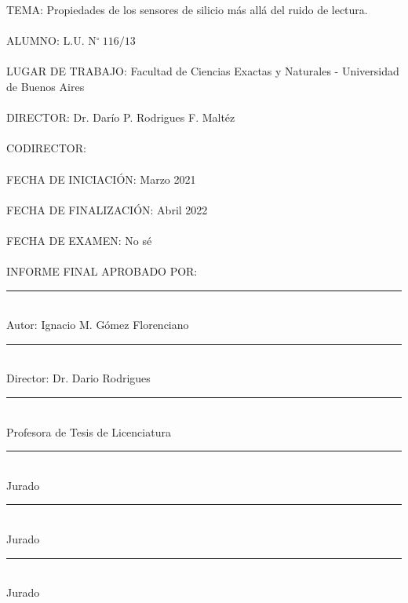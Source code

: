 \thispagestyle{empty}
\noindent TEMA: Propiedades de los sensores de silicio más allá del ruido de lectura.\\
\\
\noindent ALUMNO: L.U. N$^\circ\ 116/13$\\
\\
\noindent LUGAR DE TRABAJO: Facultad de Ciencias Exactas y Naturales - Universidad de Buenos Aires\\
\\
\noindent DIRECTOR: Dr. Darío P. Rodrigues F. Maltéz\\
\\
\noindent CODIRECTOR: \\
\\
\noindent FECHA DE INICIACIÓN: Marzo 2021\\
\\
\noindent FECHA DE FINALIZACIÓN:  Abril 2022\\
\\
\noindent FECHA DE EXAMEN: No sé\\
\\
\noindent INFORME FINAL APROBADO POR:\\
\vfill
\begin{multicols}{2}    
\rule[0pt]{2.5in}{0.5pt}\\
Autor: Ignacio M. Gómez Florenciano
\vspace{3em}

\rule[0pt]{2.5in}{0.5pt}\\
Director: Dr. Dario Rodrigues
\vspace{3em}
   
\rule[0pt]{2.5in}{0.5pt}\\
Profesora de Tesis de Licenciatura
    
\columnbreak
\rule[0pt]{2.5in}{0.5pt}\\
Jurado 
\vspace{3em}
    
\rule[0pt]{2.5in}{0.5pt}\\
Jurado 
\vspace{3em}
    
\rule[0pt]{2.5in}{0.5pt}\\
Jurado 
\end{multicols}  
\newpage
\thispagestyle{empty} \mbox{}
\thispagestyle{empty}
